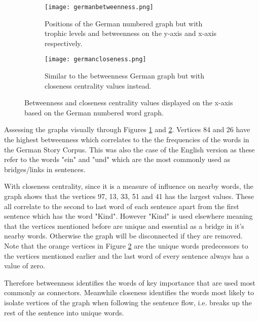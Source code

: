 \begin{figure}[H]
\centering
\begin{subfigure}{.45\textwidth}
	\hspace{-1cm} 
	\texttt{[image: germanbetweenness.png]}
	\caption{Positions of the German numbered graph but with trophic levels and betweenness on the y-axis and x-axis respectively.}
	\label{fig:gerbc}
\end{subfigure}
\hfill
\begin{subfigure}{.45\textwidth}
	\hspace{-1cm} 
	\texttt{[image: germancloseness.png]}
	\caption{Similar to the betweenness German graph but with closeness centrality values instead. }
	\label{fig:gercc}
\end{subfigure}
\caption{Betweenness and closeness centrality values displayed on the x-axis based on the German numbered word graph.}
\label{fig:gercentrality}
\end{figure}

Assessing the graphs visually through Figures \ref{fig:gerbc} and \ref{fig:gercc}. Vertices 84 and 26 have the highest betweenness which correlates to the the frequencies of the words in the German Story Corpus. This was also the case of the English version as these refer to the words "ein" and "und" which are the most commonly used as bridges/links in sentences.

With closeness centrality, since it is a measure of influence on nearby words, the graph shows that the vertices 97, 13, 33, 51 and 41 has the largest values. These all correlate to the second to last word of each sentence apart from the first sentence which has the word "Kind". However "Kind" is used elsewhere meaning that the vertices mentioned before are unique and essential as a bridge in it's nearby words. Otherwise the graph will be disconnected if they are removed. Note that the orange vertices in Figure \ref{fig:gercc} are the unique words predecessors to the vertices mentioned earlier and the last word of every sentence always has a value of zero.

Therefore betweenness identifies the words of key importance that are used most commonly as connectors. Meanwhile closeness identifies the words most likely to isolate vertices of the graph when following the sentence flow, i.e. breaks up the rest of the sentence into unique words.

